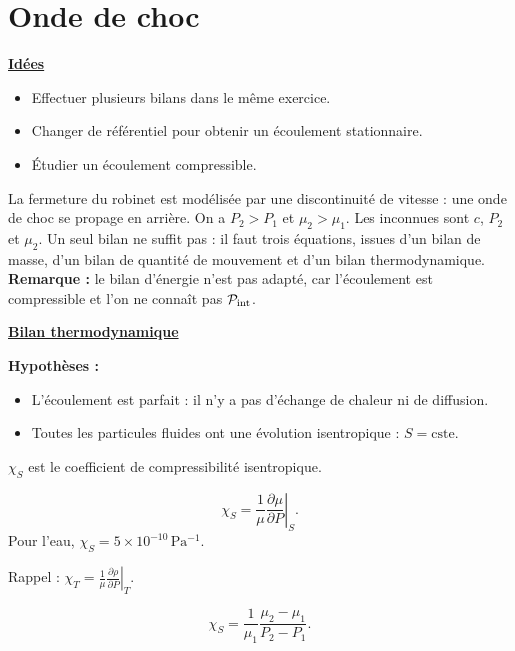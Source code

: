 \documentclass[11pt,a4paper]{article}
\newcommand{\pd}[2]{\frac{\partial #1}{\partial #2}}
\newcommand{\ux}{\vec u_x}\newcommand{\uy}{\vec u_y}\newcommand{\uz}{\vec u_z}
\newcommand{\cste}{\mathrm{cste}}
\newcommand{\titr}[1]{\par\textbf{\underline{#1}}\par\nopagebreak[3]}
\begin{document}
\section{Onde de choc}
\titr{Idées}
\begin{itemize}\item Effectuer plusieurs bilans dans le même exercice.
\item Changer de référentiel pour obtenir un écoulement stationnaire.
\item Étudier un écoulement compressible.\end{itemize}
\begin{center}\end{center}
La fermeture du robinet est modélisée par une discontinuité de vitesse : une onde de choc se propage en arrière. On a $P_2>P_1$ et $\mu_2>\mu_1$.
Les inconnues sont $c$, $P_2$ et $\mu_2$. Un seul bilan ne suffit pas : il faut trois équations, issues d'un bilan de masse, d'un bilan de quantité de mouvement et d'un bilan thermodynamique.
\textbf{Remarque :} le bilan d'énergie n'est pas adapté, car l'écoulement est compressible et l'on ne connaît pas $\mathcal P_{\mathrm{int}}$.
\titr{Bilan thermodynamique}
\par\textbf{Hypothèses :}
\begin{itemize}
\item L'écoulement est parfait : il n'y a pas d'échange de chaleur ni de diffusion.
\item Toutes les particules fluides ont une évolution isentropique : $S=\cste$.
\end{itemize}
$\chi_S$ est le coefficient de compressibilité isentropique.
\begin{cadre}\[\chi_S=\frac1\mu\left.\pd\mu P\right|_S.\]
Pour l'eau, $\chi_S=5\times10^{-10}\,\mathrm{Pa^{-1}}$.\end{cadre}
Rappel : $\displaystyle\chi_T=\frac1\mu\left.\pd\rho P\right|_T$.
\begin{cadre}\[\chi_S=\frac1{\mu_1}\frac{\mu_2-\mu_1}{P_2-P_1}.\tag{1}\]\end{cadre}
\end{document}
